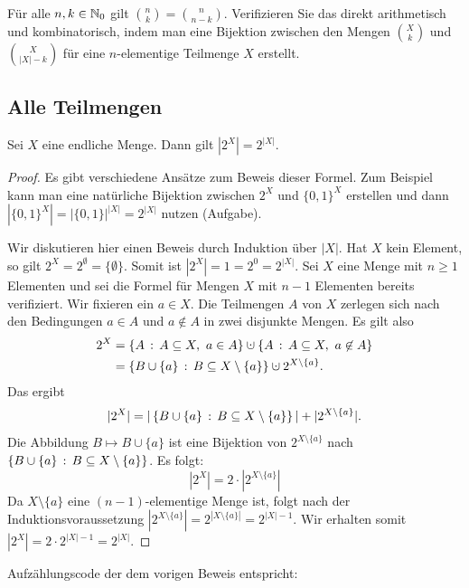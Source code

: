 \begin{aufg}
	Für alle $n,k \in \mathbb{N}_0$ gilt $\binom{n}{k} = \binom{n}{n-k}$. Verifizieren Sie das direkt arithmetisch und kombinatorisch, indem man eine Bijektion zwischen 
	den Mengen $\binom{X}{k}$ und $\binom{X}{|X|-k}$ für eine $n$-elementige Teilmenge $X$ erstellt. 
\end{aufg} 

\subsection{Alle Teilmengen} 

\begin{thm}
\label{thm:kard-potenzmenge}
	Sei $X$ eine endliche Menge. Dann gilt $|2^X|=2^{|X|}$. 
\end{thm} 
\begin{proof} 
	Es gibt verschiedene Ansätze zum Beweis dieser Formel. Zum Beispiel kann man eine natürliche Bijektion zwischen  $2^X$ und $\{0,1\}^X$ erstellen und dann $|\{0,1\}^X| = |\{0,1\}|^{|X|} = 2^{|X|}$ nutzen (Aufgabe). 
	
	Wir diskutieren hier einen Beweis durch Induktion über $|X|$. Hat $X$ kein Element, so gilt $2^X = 2^\emptyset = \{ \emptyset \}$. Somit ist $|2^X| = 1 = 2^0 = 2^{|X|}$. Sei $X$ eine Menge mit $n \ge 1$ Elementen und sei die Formel für Mengen $X$ mit $n-1$ Elementen bereits verifiziert. Wir fixieren ein $a \in X$. Die Teilmengen $A$ von $X$ zerlegen sich nach den Bedingungen $a \in A$ und $a \not\in A$ in zwei disjunkte Mengen. Es gilt also
	\begin{align*}
			2^X & = \setcond{A}{A \subseteq X, \ a \in A} \cupdot \setcond{A}{A \subseteq X, \ a \not\in A}
			\\ & = \setcond{B \cup \{a\}}{B \subseteq X \setminus \{a\}} \cupdot 2^{X \setminus \{a\}}. 
	\end{align*}
	Das ergibt
	\[
		|2^X| = |\left\{ B \cup \{a\} \,:\, B \subseteq X \setminus \{a\} \right\}| + | 2^{X \setminus \{a\}}|. 
	\]
	Die Abbildung $B \mapsto B \cup \{a\}$ ist eine Bijektion von $2^{X \setminus \{a\}}$ nach $\left\{ B \cup \{a\} \,:\, B \subseteq X \setminus \{a\} \right\}$. Es folgt: 
	\[
		|2^X| = 2 \cdot |2^{X \setminus \{a\}}|
	\]
	Da $X \setminus \{a\}$ eine $(n-1)$-elementige Menge ist, folgt nach der Induktionsvoraussetzung $|2^{X \setminus \{a\}}| = 2^{|X \setminus \{a\}|} = 2^{|X|-1}$. Wir erhalten somit $|2^{X}| = 2 \cdot 2^{|X|-1} = 2^{|X|}$. 
\end{proof} 

\begin{bem} Aufzählungscode der dem vorigen Beweis entspricht: 

\end{bem} 


